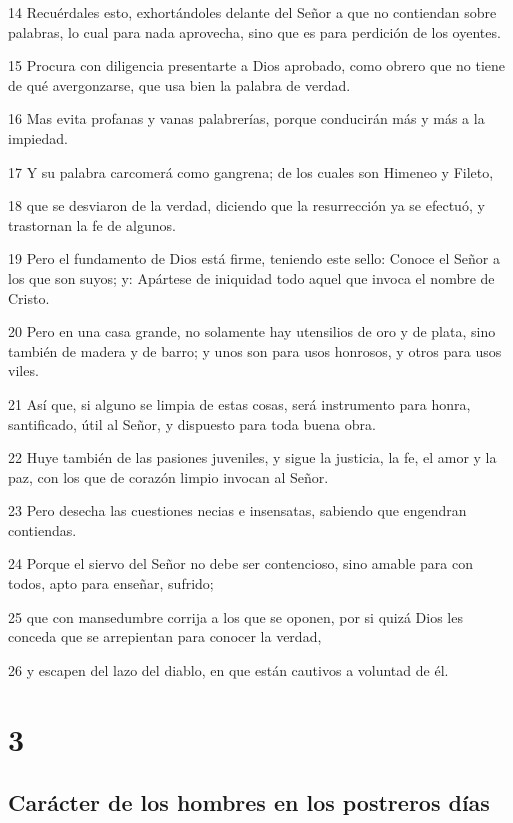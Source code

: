 \par 14 Recuérdales esto, exhortándoles delante del Señor a que no contiendan sobre palabras, lo cual para nada aprovecha, sino que es para perdición de los oyentes.
\par 15 Procura con diligencia presentarte a Dios aprobado, como obrero que no tiene de qué avergonzarse, que usa bien la palabra de verdad.
\par 16 Mas evita profanas y vanas palabrerías, porque conducirán más y más a la impiedad.
\par 17 Y su palabra carcomerá como gangrena; de los cuales son Himeneo y Fileto,
\par 18 que se desviaron de la verdad, diciendo que la resurrección ya se efectuó, y trastornan la fe de algunos.
\par 19 Pero el fundamento de Dios está firme, teniendo este sello: Conoce el Señor a los que son suyos; y: Apártese de iniquidad todo aquel que invoca el nombre de Cristo.
\par 20 Pero en una casa grande, no solamente hay utensilios de oro y de plata, sino también de madera y de barro; y unos son para usos honrosos, y otros para usos viles.
\par 21 Así que, si alguno se limpia de estas cosas, será instrumento para honra, santificado, útil al Señor, y dispuesto para toda buena obra.
\par 22 Huye también de las pasiones juveniles, y sigue la justicia, la fe, el amor y la paz, con los que de corazón limpio invocan al Señor.
\par 23 Pero desecha las cuestiones necias e insensatas, sabiendo que engendran contiendas.
\par 24 Porque el siervo del Señor no debe ser contencioso, sino amable para con todos, apto para enseñar, sufrido;
\par 25 que con mansedumbre corrija a los que se oponen, por si quizá Dios les conceda que se arrepientan para conocer la verdad,
\par 26 y escapen del lazo del diablo, en que están cautivos a voluntad de él.

\chapter{3}

\section*{Carácter de los hombres en los postreros días}

